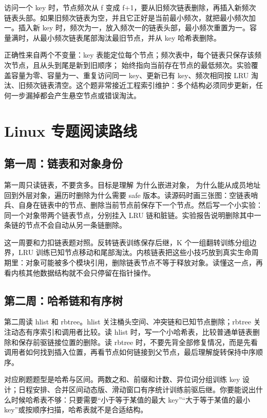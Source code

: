 访问一个 key 时，节点频次从 f 变成 f+1，要从旧频次链表删除，再插入新频次链表头部。如果旧频次链表为空，并且它正好是当前最小频次，就把最小频次加一。插入新 key 时，频次为一，放入频次一的链表头部，最小频次重置为一。容量满时，从最小频次链表尾部淘汰最旧节点，并从 key 哈希表删除。

正确性来自两个不变量：key 表能定位每个节点；频次表中，每个链表只保存该频次节点，且从头到尾是新到旧顺序； 始终指向当前存在节点的最低频次。实验覆盖容量为零、容量为一、重复访问同一 key、更新已有 key、频次相同按 LRU 淘汰、旧频次链表清空。这个题非常接近工程索引维护：多个结构必须同步更新，任何一步漏掉都会产生悬空节点或错误淘汰。

\section{Linux 专题阅读路线}

\subsection{第一周：链表和对象身份}

第一周只读链表，不要贪多。目标是理解  为什么嵌进对象， 为什么能从成员地址回到外层对象，遍历时删除为什么需要 safe 版本。读源码时画三张图：空链表哨兵、自身在链表中的节点、删除当前节点前保存下一个节点。然后写一个小实验：同一个对象带两个链表节点，分别挂入 LRU 链和脏链。实验报告说明删除其中一条链的节点不会自动从另一条链删除。

这一周要和力扣链表题对照。反转链表训练保存后继，K 个一组翻转训练分组边界，LRU 训练已知节点移动和尾部淘汰。内核链表把这些小技巧放到真实生命周期里：对象可能被多个模块引用，删除链表节点不等于释放对象。读懂这一点，再看内核其他数据结构就不会只停留在指针操作。

\subsection{第二周：哈希链和有序树}

第二周读 hlist 和 rbtree。hlist 关注桶头空间、冲突链和已知节点删除；rbtree 关注动态有序索引和调用者比较。读 hlist 时，写一个小哈希表，比较普通单链表删除和保存前驱链接位置的删除。读 rbtree 时，不要先背全部修复情况，而是先看调用者如何找到插入位置，再看节点如何链接到父节点，最后理解旋转保持中序顺序。

对应刷题题型是哈希与区间。两数之和、前缀和计数、异位词分组训练 key 设计；日程安排、合并区间动态版、滑动窗口有序统计训练前驱后继。你要能说出什么时候哈希表不够：只要需要“小于等于某值的最大 key”“大于等于某值的最小 key”或按顺序扫描，哈希表就不是合适结构。

